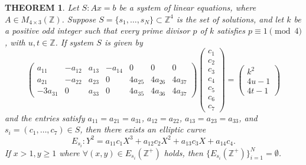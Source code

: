 \documentclass[11pt]{amsart}
\newtheorem{theorem}{THEOREM}
\begin{document}
\begin{theorem}\label{thm10}
Let $S: Ax=b$ be a system of linear equations, where $A\in M_{4\times3}(\mathbb{Z})$. Suppose $S=\{s_1,\dots,s_N\}\subset\mathbb{Z}^4$ is the set of solutions, and let $k$ be a positive odd integer such that every prime divisor $p$ of $k$ satisfies $p\equiv1\pmod4$, with $u,t\in\mathbb{Z}$. If system $S$ is given by
\[
\begin{pmatrix}
a_{11}&-a_{12}&a_{13}&-a_{14}&0&0&0\\
a_{21}&-a_{22}&a_{23}&0&4a_{25}&4a_{26}&4a_{37}\\
-3a_{31}&0&a_{33}&0&4a_{35}&4a_{36}&4a_{37}
\end{pmatrix}
\begin{pmatrix}c_1\\c_2\\c_3\\c_4\\c_5\\c_6\\c_7\end{pmatrix}
=\begin{pmatrix}k^2\\4u-1\\4t-1\end{pmatrix}
\]
and the entries satisfy $a_{11}=a_{21}=a_{31}$, $a_{12}=a_{22}$, $a_{13}=a_{23}=a_{33}$, and $s_i=(c_1,\dots,c_7)\in S$, then there exists an elliptic curve
\[
E_{s_i}: Y^2=a_{11}c_1X^3+a_{12}c_2X^2+a_{13}c_3X+a_{14}c_4.
\]
If $x>1,y\ge1$ where $\forall(x,y)\in E_{s_i}(\mathbb{Z}^+)$ holds, then $\{E_{s_i}(\mathbb{Z}^+)\}_{i=1}^N=\emptyset$.
\end{theorem}
\end{document}

